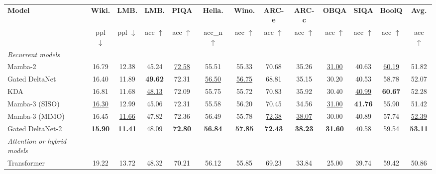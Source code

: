 \documentclass[10pt, logo, onecolumn, copyright]{nv}
\begin{document}
\begin{table}[t!]
\vspace{0mm}
\centering
\footnotesize
\addtolength{\tabcolsep}{-3.2pt}
\begin{tabular}{l|cc|cccccccccc}
\toprule
\textbf{Model} & \textbf{Wiki.} & \textbf{LMB.} & \textbf{LMB.} & \textbf{PIQA} & \textbf{Hella.} & \textbf{Wino.} & \textbf{ARC-e} & \textbf{ARC-c} & \textbf{OBQA} & \textbf{SIQA} & \textbf{BoolQ} & \textbf{Avg.} \\
 & ppl $\downarrow$ & ppl $\downarrow$ & acc $\uparrow$ & acc $\uparrow$ & acc\_n $\uparrow$ & acc $\uparrow$ & acc $\uparrow$ & acc $\uparrow$ & acc $\uparrow$ & acc $\uparrow$ & acc $\uparrow$ & acc $\uparrow$ \\
\midrule
\midrule
\textit{Recurrent models} \\
\hspace{2mm} Mamba-2 & 16.79 & 12.38 & 45.24 & \underline{72.58} & 55.51 & 55.33 & 70.68 & 35.26 & \underline{31.00} & 40.63 & \underline{60.19} & 51.82 \\
\hspace{2mm} Gated DeltaNet & 16.40 & 11.89 & \textbf{49.62} & 72.31 & \underline{56.50} & \underline{56.75} & 68.81 & 35.15 & 30.20 & 40.53 & 58.78 & 52.07 \\
\hspace{2mm} KDA & 16.81 & 11.68 & \underline{48.13} & 72.09 & 55.75 & 55.72 & 70.83 & 35.92 & 30.40 & \underline{40.99} & \textbf{60.67} & 52.28 \\
\hspace{2mm} Mamba-3 (SISO) & \underline{16.30} & 12.99 & 45.06 & 72.31 & 55.58 & 56.20 & 70.45 & 34.56 & \underline{31.00} & \textbf{41.76} & 55.90 & 51.42 \\
\hspace{2mm} Mamba-3 (MIMO) & 16.45 & \underline{11.66} & 47.82 & 72.36 & 56.49 & 55.78 & \underline{72.38} & \underline{38.07} & 30.00 & 40.89 & 57.74 & \underline{52.39} \\
\hspace{2mm} Gated DeltaNet-2 & \textbf{15.90} & \textbf{11.41} & 48.09 & \textbf{72.80} & \textbf{56.84} & \textbf{57.85} & \textbf{72.43} & \textbf{38.23} & \textbf{31.60} & 40.58 & 59.54 & \textbf{53.11} \\
\midrule
\textit{Attention or hybrid models} \\
\hspace{2mm} Transformer & 19.22 & 13.72 & 48.32 & 70.21 & 56.12 & 55.85 & 69.23 & 33.84 & 25.00 & 39.74 & 59.42 & 50.86 \\

\end{tabular}
\end{table}
\end{document}
